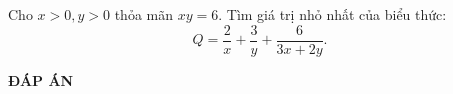 \begin{ex}%
	Cho $x>0, y>0$ thỏa mãn $xy=6.$ Tìm giá trị nhỏ nhất của biểu thức: $$Q=\dfrac{2}{x}+\dfrac{3}{y}+\dfrac{6}{3x+2y}.$$
\end{ex}

\newpage
\begin{center}
	\textbf{ĐÁP ÁN}
\end{center}
\begin{multicols}{10}
	 
\end{multicols}
